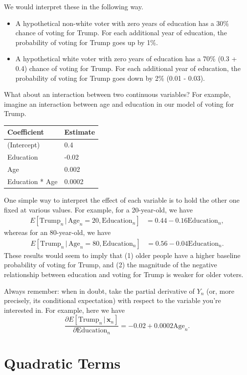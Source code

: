 \documentclass[
  12pt,
  oneside,openany]{book}
\begin{document}
We would interpret these in the following way.

\begin{itemize}
\item
  A hypothetical non-white voter with zero years of education has a 30\% chance of voting for Trump. For each additional year of education, the probability of voting for Trump goes up by 1\%.
\item
  A hypothetical white voter with zero years of education has a 70\% (0.3 + 0.4) chance of voting for Trump. For each additional year of education, the probability of voting for Trump goes down by 2\% (0.01 - 0.03).
\end{itemize}

What about an interaction between two continuous variables? For example, imagine an interaction between age and education in our model of voting for Trump.

\begin{longtable}[]{@{}ll@{}}
\toprule
Coefficient & Estimate\tabularnewline
\midrule
\endhead
(Intercept) & 0.4\tabularnewline
Education & -0.02\tabularnewline
Age & 0.002\tabularnewline
Education * Age & 0.0002\tabularnewline
\bottomrule
\end{longtable}

One simple way to interpret the effect of each variable is to hold the other one fixed at various values. For example, for a 20-year-old, we have
\[
\begin{aligned}
E[\text{Trump}_n \,|\, \text{Age}_n = 20, \text{Education}_n] &= 0.44 - 0.16 \text{Education}_n,
\end{aligned}
\]
whereas for an 80-year-old, we have
\[
\begin{aligned}
E[\text{Trump}_n \,|\, \text{Age}_n = 80, \text{Education}_n] &= 0.56 - 0.04 \text{Education}_n.
\end{aligned}
\]
These results would seem to imply that (1) older people have a higher baseline probability of voting for Trump, and (2) the magnitude of the negative relationship between education and voting for Trump is weaker for older voters.

Always remember: when in doubt, take the partial derivative of \(Y_n\) (or, more precisely, its conditional expectation) with respect to the variable you're interested in. For example, here we have
\[
\frac{\partial{}E[\text{Trump}_n \,|\, \mathbf{x}_n]}{\partial{}\text{Education}_n} = -0.02 + 0.0002 \text{Age}_n.
\]

\hypertarget{quadratic-terms}{%
\section{Quadratic Terms}\label{quadratic-terms}}
\end{document}
